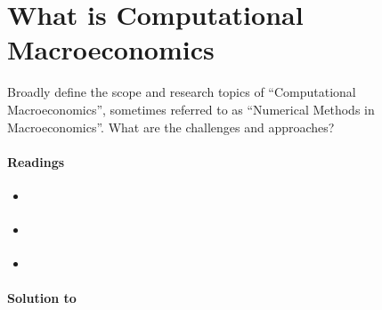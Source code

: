 \section[What is Computational Macroeconomics]{What is Computational Macroeconomics\label{ex:ComputationalMacroeconomics}}
Broadly define the scope and research topics of \enquote{Computational Macroeconomics},
  sometimes referred to as \enquote{Numerical Methods in Macroeconomics}.
What are the challenges and approaches?

\paragraph{Readings}
\begin{itemize}
\item \textcite[Ch. 1--2]{Fernandez-Villaverde.Rubio-Ramirez.Schorfheide_2016_SolutionEstimationMethods}
\item \textcite[Ch. 1--2]{Maliar.Maliar_2014_NumericalMethodsLargeScale}
\item \textcite[Ch. 1]{Judd_1998_NumericalMethodsEconomics}
\end{itemize}

\begin{solution}\textbf{Solution to }
\ifDisplaySolutions%

\fi
\newpage
\end{solution}